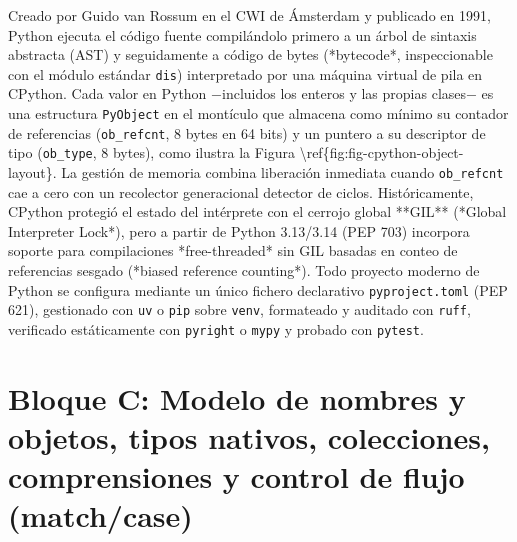 \documentclass{book}
\begin{document}
Creado por Guido van Rossum en el CWI de Ámsterdam y publicado en 1991, Python ejecuta el código fuente compilándolo primero a un árbol de sintaxis abstracta (AST) y seguidamente a código de bytes (*bytecode*, inspeccionable con el módulo estándar \texttt{dis}) interpretado por una máquina virtual de pila en CPython. Cada valor en Python \(-\)incluidos los enteros y las propias clases\(-\) es una estructura \texttt{PyObject} en el montículo que almacena como mínimo su contador de referencias (\texttt{ob\_refcnt}, 8 bytes en 64 bits) y un puntero a su descriptor de tipo (\texttt{ob\_type}, 8 bytes), como ilustra la Figura \textbackslash{}ref\{fig:fig-cpython-object-layout\}. La gestión de memoria combina liberación inmediata cuando \texttt{ob\_refcnt} cae a cero con un recolector generacional detector de ciclos. Históricamente, CPython protegió el estado del intérprete con el cerrojo global **GIL** (*Global Interpreter Lock*), pero a partir de Python 3.13/3.14 (PEP 703) incorpora soporte para compilaciones *free-threaded* sin GIL basadas en conteo de referencias sesgado (*biased reference counting*). Todo proyecto moderno de Python se configura mediante un único fichero declarativo \texttt{pyproject.toml} (PEP 621), gestionado con \texttt{uv} o \texttt{pip} sobre \texttt{venv}, formateado y auditado con \texttt{ruff}, verificado estáticamente con \texttt{pyright} o \texttt{mypy} y probado con \texttt{pytest}.

\section{Bloque C: Modelo de nombres y objetos, tipos nativos, colecciones, comprensiones y control de flujo (match/case)}
\end{document}
